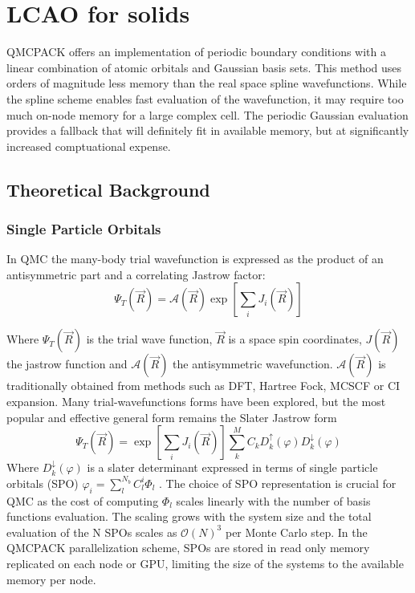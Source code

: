 \chapter{LCAO for solids}
\label{chap:LCAO}
QMCPACK offers an implementation of periodic boundary conditions with a linear combination of atomic orbitals and Gaussian basis sets. This method uses orders of magnitude less memory than the real space spline wavefunctions. While the spline scheme enables fast evaluation of the wavefunction, it may require too much on-node memory for a large complex cell. The periodic Gaussian evaluation provides a fallback that will definitely fit in available memory, but at significantly increased comptuational expense. 

\section{Theoretical Background}

\subsection{Single Particle Orbitals}

In QMC the many-body trial wavefunction is expressed as the product of an antisymmetric part and a correlating Jastrow factor:
 \begin{equation}
\Psi_T(\vec{R}) = \mathcal{A}(\vec{R}) \exp\left[\sum_i J_i(\vec{R})\right]
\end{equation}


Where $\Psi_T(\vec{R})$ is the trial wave function, $\vec{R}$ is a space spin coordinates, $J(\vec{R})$ the jastrow function and $\mathcal{A}(\vec{R})$  the antisymmetric wavefunction. $\mathcal{A}(\vec{R})$  is traditionally obtained from methods such as DFT, Hartree Fock, MCSCF or CI expansion.  Many trial-wavefunctions forms have been explored, but the most popular and effective general form remains the Slater Jastrow form
 \begin{equation}
\Psi_T(\vec{R}) = \exp\left[\sum_i J_i(\vec{R})\right]\sum_k^M C_kD_k^{\uparrow}(\varphi)D_k^{\downarrow}(\varphi)
\end{equation}
Where $D_k^{\downarrow}(\varphi)$ is a slater determinant expressed in terms of single particle orbitals (SPO) $\varphi_i=\sum^{N_b}_l C_l ^i \Phi_l$ . The choice of SPO representation is crucial for QMC as the cost of computing $\Phi_l$ scales linearly with the number of basis functions evaluation.  The scaling grows with the system size and the total evaluation of the N SPOs scales as  $ \mathcal{O}(N)^3$ per Monte Carlo step. In the QMCPACK parallelization scheme, SPOs are stored in read only memory replicated on each node or GPU, limiting the size of the systems to the available memory per node. 


